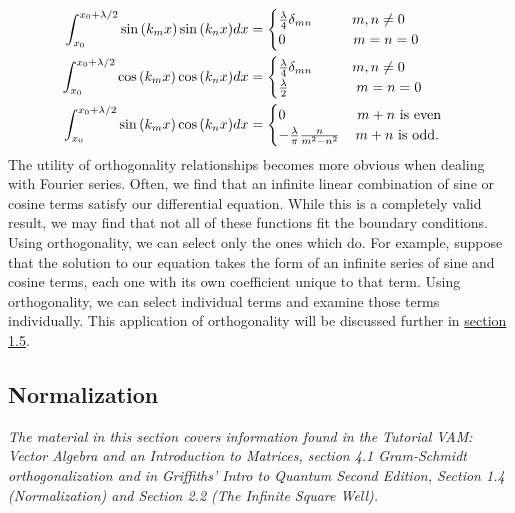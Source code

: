 \documentclass[11pt]{report}
\begin{document}
    \begin{align}
        \int_{x_0}^{x_0+\lambda/2}\sin{(k_mx)}\sin{(k_nx)}dx&=\begin{cases}\frac{\lambda}{4}\delta_{mn}\text{\hspace{1cm}$m,n\neq0$}\\0\text{\hspace{1.7cm}$m=n=0$}\end{cases}\\
        \int_{x_0}^{x_0+\lambda/2}\cos{(k_mx)}\cos{(k_nx)}dx&=\begin{cases}\frac{\lambda}{4}\delta_{mn}\text{\hspace{1cm}$m,n\neq0$}\\\frac{\lambda}{2}\text{\hspace{1.7cm}$m=n=0$}\end{cases}\\
        \int_{x_0}^{x_0+\lambda/2}\sin{(k_mx)}\cos{(k_nx)}dx&=\begin{cases}0\text{\hspace{1.8cm}$m+n$ is even}\\-\frac{\lambda}{\pi}\frac{n}{m^2-n^2}\text{\hspace{0.4cm}$m+n$ is odd}.\end{cases}
    \end{align}
The utility of orthogonality relationships becomes more obvious when dealing with Fourier series. Often, we find that an infinite linear combination of sine or cosine terms satisfy our differential equation. While this is a completely valid result, we may find that not all of these functions fit the boundary conditions. Using orthogonality, we can select only the ones which do. For example, suppose that the solution to our equation takes the form of an infinite series of sine and cosine terms, each one with its own coefficient unique to that term. Using orthogonality, we can select individual terms and examine those terms individually. This application of orthogonality will be discussed further in \hyperlink{section.1.5}{section 1.5}.



\subsection{Normalization}

\emph{The material in this section covers information found in the Tutorial VAM: Vector Algebra and an Introduction to Matrices, section 4.1 Gram-Schmidt orthogonalization and in Griffiths' Intro to Quantum Second Edition, Section 1.4 (Normalization) and Section 2.2 (The Infinite Square Well).}\\
\end{document}
